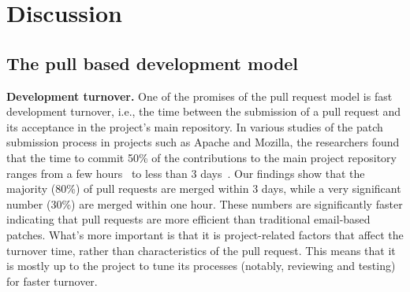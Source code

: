 \documentclass{acm_proc_article-sp}
\begin{document}

\section{Discussion}
\label{sec:discussion}

\subsection{The pull based development model}

\textbf{Development turnover.} One of the promises of the pull request model
is fast development turnover, i.e., the time between the submission of a pull
request and its acceptance in the project's main repository. In various studies of
the patch submission process in projects such as Apache and Mozilla, the
researchers found that the time to commit 50\% of the contributions to the main
project repository ranges from a few hours~\cite{Rigby08} to less than 3
days~\cite{Weiss08, Baysa12}. Our findings show that the majority (80\%) of
pull requests are merged within 3 days, while a very significant number (30\%)
are merged within one hour. These numbers are significantly faster indicating
that pull requests are more efficient than traditional email-based patches.
What's more important is that it is project-related factors that affect the
turnover time, rather than characteristics of the pull request. This means that
it is mostly up to the project to tune its processes (notably, reviewing and
testing) for faster turnover.

\end{document}
